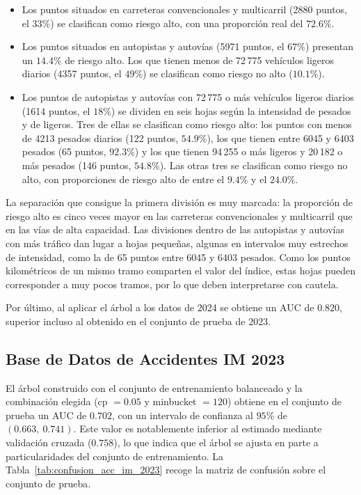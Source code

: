 \documentclass[twoside,a4paper,12pt,onecolumn,openany]{book}
\begin{document}
\begin{itemize}
    \item Los puntos situados en carreteras convencionales y multicarril (2880 puntos, el $33\%$) se clasifican como riesgo alto, con una proporción real del $72.6\%$.
    \item Los puntos situados en autopistas y autovías (5971 puntos, el $67\%$) presentan un $14.4\%$ de riesgo alto. Los que tienen menos de 72\,775 vehículos ligeros diarios (4357 puntos, el $49\%$) se clasifican como riesgo no alto ($10.1\%$).
    \item Los puntos de autopistas y autovías con 72\,775 o más vehículos ligeros diarios (1614 puntos, el $18\%$) se dividen en seis hojas según la intensidad de pesados y de ligeros. Tres de ellas se clasifican como riesgo alto: los puntos con menos de 4213 pesados diarios (122 puntos, $54.9\%$), los que tienen entre 6045 y 6403 pesados (65 puntos, $92.3\%$) y los que tienen 94\,255 o más ligeros y 20\,182 o más pesados (146 puntos, $54.8\%$). Las otras tres se clasifican como riesgo no alto, con proporciones de riesgo alto de entre el $9.4\%$ y el $24.0\%$.
\end{itemize}
 
La separación que consigue la primera división es muy marcada: la proporción de riesgo alto es cinco veces mayor en las carreteras convencionales y multicarril que en las vías de alta capacidad. Las divisiones dentro de las autopistas y autovías con más tráfico dan lugar a hojas pequeñas, algunas en intervalos muy estrechos de intensidad, como la de 65 puntos entre 6045 y 6403 pesados. Como los puntos kilométricos de un mismo tramo comparten el valor del índice, estas hojas pueden corresponder a muy pocos tramos, por lo que deben interpretarse con cautela.
 
\vspace{0.5cm}
 
Por último, al aplicar el árbol a los datos de 2024 se obtiene un AUC de $0.820$, superior incluso al obtenido en el conjunto de prueba de 2023.
 
\subsection{Base de Datos de Accidentes IM 2023}
 
El árbol construido con el conjunto de entrenamiento balanceado y la combinación elegida (cp $=0.05$ y minbucket $=120$) obtiene en el conjunto de prueba un AUC de $0.702$, con un intervalo de confianza al $95\%$ de $(0.663,\ 0.741)$. Este valor es notablemente inferior al estimado mediante validación cruzada ($0.758$), lo que indica que el árbol se ajusta en parte a particularidades del conjunto de entrenamiento. La Tabla~\ref{tab:confusion_acc_im_2023} recoge la matriz de confusión sobre el conjunto de prueba.
 
\end{document}
